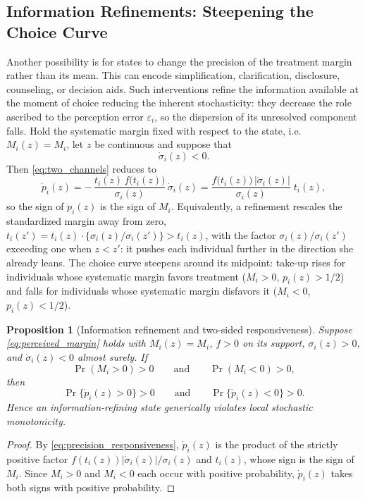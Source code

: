 \documentclass[11pt]{article}
\newtheorem{proposition}{Proposition}
\newcommand{\1}{\mathbf{1}}
\begin{document}
\subsection{Information Refinements: Steepening the Choice Curve}
\label{sec:precision}

Another possibility is for states to change the precision of the treatment
margin rather than its mean. This can encode simplification,
clarification, disclosure, counseling, or decision aids. Such interventions
refine the information available at the moment of choice reducing the inherent stochasticity: they decrease the role ascribed to the perception error \(\varepsilon_i\), so
the dispersion of its unresolved component falls. Hold the systematic
margin fixed with respect to the state, i.e. \(M_i(z)=M_i\), let $z$ be continuous and suppose that
\[
\dot\sigma_i(z)<0.
\]
Then \eqref{eq:two_channels} reduces to
\begin{equation}
\dot p_i(z)
=
-\,\frac{t_i(z)\,f\big(t_i(z)\big)}{\sigma_i(z)}\,\dot\sigma_i(z)
=
\frac{f\big(t_i(z)\big)\,\lvert\dot\sigma_i(z)\rvert}{\sigma_i(z)}\;t_i(z),
\label{eq:precision_responsiveness}
\end{equation}
so the sign of \(\dot p_i(z)\) is the sign of \(M_i\). Equivalently, a
refinement rescales the standardized margin away from zero,
\(t_i(z')=t_i(z)\cdot\{\sigma_i(z)/\sigma_i(z')\}>t_i(z)\), with the factor $\sigma_i(z)/\sigma_i(z')$
exceeding one when $z<z'$: it pushes each individual further in the direction she
already leans. The choice curve steepens around its midpoint: take-up rises
for individuals whose systematic margin favors treatment
(\(M_i>0\), \(p_i(z)>1/2\)) and falls for individuals whose systematic
margin disfavors it (\(M_i<0\), \(p_i(z)<1/2\)).

\begin{proposition}[Information refinement and two-sided responsiveness]
\label{prop:refinement}
Suppose \eqref{eq:perceived_margin} holds with \(M_i(z)=M_i\), \(f>0\) on
its support, \(\sigma_i(z)>0\), and \(\dot\sigma_i(z)<0\) almost surely. If
\[
\Pr(M_i>0)>0
\qquad\text{and}\qquad
\Pr(M_i<0)>0,
\]
then
\[
\Pr\{\dot p_i(z)>0\}>0
\qquad\text{and}\qquad
\Pr\{\dot p_i(z)<0\}>0.
\]
Hence an information-refining state generically violates local stochastic
monotonicity.
\end{proposition}

\begin{proof}
By \eqref{eq:precision_responsiveness}, \(\dot p_i(z)\) is the product of
the strictly positive factor
\(f(t_i(z))\lvert\dot\sigma_i(z)\rvert/\sigma_i(z)\) and \(t_i(z)\), whose
sign is the sign of \(M_i\). Since \(M_i>0\) and \(M_i<0\) each occur with
positive probability, \(\dot p_i(z)\) takes both signs with positive
probability.
\end{proof}
\end{document}
